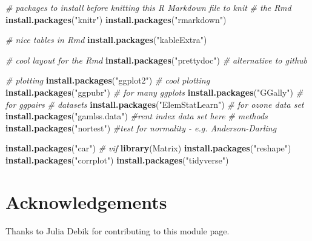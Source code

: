 \documentclass[]{article}
\newenvironment{Shaded}{\begin{snugshade}}{\end{snugshade}}
\newcommand{\KeywordTok}[1]{\textcolor[rgb]{0.13,0.29,0.53}{\textbf{#1}}}
\newcommand{\StringTok}[1]{\textcolor[rgb]{0.31,0.60,0.02}{#1}}
\newcommand{\CommentTok}[1]{\textcolor[rgb]{0.56,0.35,0.01}{\textit{#1}}}
\newcommand{\NormalTok}[1]{#1}
\begin{document}
\begin{Shaded}
\begin{Highlighting}[]
\CommentTok{# packages to install before knitting this R Markdown file to knit}
\CommentTok{# the Rmd}
\KeywordTok{install.packages}\NormalTok{(}\StringTok{"knitr"}\NormalTok{)}
\KeywordTok{install.packages}\NormalTok{(}\StringTok{"rmarkdown"}\NormalTok{)}

\CommentTok{# nice tables in Rmd}
\KeywordTok{install.packages}\NormalTok{(}\StringTok{"kableExtra"}\NormalTok{)}

\CommentTok{# cool layout for the Rmd}
\KeywordTok{install.packages}\NormalTok{(}\StringTok{"prettydoc"}\NormalTok{)  }\CommentTok{# alternative to github}

\CommentTok{# plotting}
\KeywordTok{install.packages}\NormalTok{(}\StringTok{"ggplot2"}\NormalTok{)  }\CommentTok{# cool plotting}
\KeywordTok{install.packages}\NormalTok{(}\StringTok{"ggpubr"}\NormalTok{)  }\CommentTok{# for many ggplots}
\KeywordTok{install.packages}\NormalTok{(}\StringTok{"GGally"}\NormalTok{)  }\CommentTok{# for ggpairs}
\CommentTok{# datasets}
\KeywordTok{install.packages}\NormalTok{(}\StringTok{"ElemStatLearn"}\NormalTok{)  }\CommentTok{# for ozone data set}
\KeywordTok{install.packages}\NormalTok{(}\StringTok{"gamlss.data"}\NormalTok{)  }\CommentTok{#rent index data set here}
\CommentTok{# methods}
\KeywordTok{install.packages}\NormalTok{(}\StringTok{"nortest"}\NormalTok{)  }\CommentTok{#test for normality - e.g. Anderson-Darling}

\KeywordTok{install.packages}\NormalTok{(}\StringTok{"car"}\NormalTok{)  }\CommentTok{# vif}
\KeywordTok{library}\NormalTok{(Matrix)}
\KeywordTok{install.packages}\NormalTok{(}\StringTok{"reshape"}\NormalTok{)}
\KeywordTok{install.packages}\NormalTok{(}\StringTok{"corrplot"}\NormalTok{)}
\KeywordTok{install.packages}\NormalTok{(}\StringTok{"tidyverse"}\NormalTok{)}
\end{Highlighting}
\end{Shaded}

\section{Acknowledgements}\label{acknowledgements}

Thanks to Julia Debik for contributing to this module page.
\end{document}

